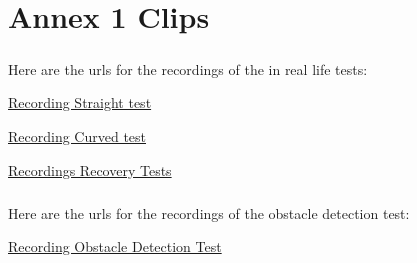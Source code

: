 
%


\chapter{Annex 1 Clips}
\label{ann:annex1}
\paragraph{}Here are the urls for the recordings of the in real life tests: 

\href{https://unlpt-my.sharepoint.com/:v:/g/personal/ta_pedreira_fct_unl_pt/EZKhOlzN6dxChlEMwZ6PDAQBuzKtxDfMwI_u-DHT0shNPQ?nav=eyJyZWZlcnJhbEluZm8iOnsicmVmZXJyYWxBcHAiOiJPbmVEcml2ZUZvckJ1c2luZXNzIiwicmVmZXJyYWxBcHBQbGF0Zm9ybSI6IldlYiIsInJlZmVycmFsTW9kZSI6InZpZXciLCJyZWZlcnJhbFZpZXciOiJNeUZpbGVzTGlua0NvcHkifX0&e=qjZgS4}{Recording Straight test}

\href{https://unlpt-my.sharepoint.com/:v:/g/personal/ta_pedreira_fct_unl_pt/EYNDfcd1sxFOjmbHCLmgkYoB8XdaPpg81FVpM2ALpQdb3A?nav=eyJyZWZlcnJhbEluZm8iOnsicmVmZXJyYWxBcHAiOiJPbmVEcml2ZUZvckJ1c2luZXNzIiwicmVmZXJyYWxBcHBQbGF0Zm9ybSI6IldlYiIsInJlZmVycmFsTW9kZSI6InZpZXciLCJyZWZlcnJhbFZpZXciOiJNeUZpbGVzTGlua0NvcHkifX0&e=gAZbTG}{Recording Curved test}

\href{https://unlpt-my.sharepoint.com/:f:/g/personal/ta_pedreira_fct_unl_pt/ErI1Yke-htlHpjyAuzj5jVEBcy60Cer6v6V-Kud-8u2tPg?e=Md1Hs7}{Recordings Recovery Tests}

\paragraph{}Here are the urls for the recordings of the obstacle detection test: 

\href{https://unlpt-my.sharepoint.com/:v:/g/personal/ta_pedreira_fct_unl_pt/EW1cg9_EnwtFuL5H22FGqjEBC-na3bCci0gVvmno1ZOmvw?nav=eyJyZWZlcnJhbEluZm8iOnsicmVmZXJyYWxBcHAiOiJPbmVEcml2ZUZvckJ1c2luZXNzIiwicmVmZXJyYWxBcHBQbGF0Zm9ybSI6IldlYiIsInJlZmVycmFsTW9kZSI6InZpZXciLCJyZWZlcnJhbFZpZXciOiJNeUZpbGVzTGlua0NvcHkifX0&e=9UU23Y}{Recording Obstacle Detection Test}
